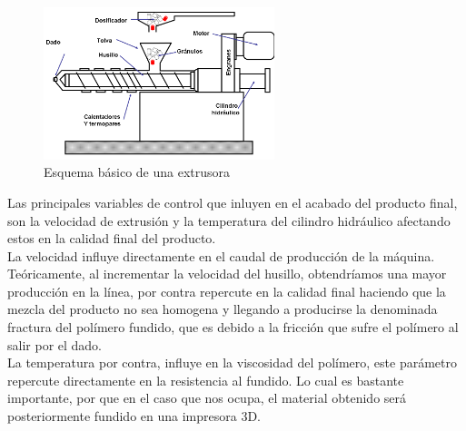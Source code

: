 \begin{figure}[H]
        \centering
        \includegraphics[width=0.6\textwidth]{images/extrusor.png}
        \caption{Esquema básico de una extrusora}
        \label{fig:estado_extrusora}
\end{figure}

Las principales variables de control que inluyen en el acabado del producto final, son la velocidad de extrusión y la temperatura del cilindro hidráulico afectando estos en la calidad final del producto.\\

La velocidad influye directamente en el caudal de producción de la máquina. Teóricamente, al incrementar la velocidad del husillo, obtendríamos una mayor producción en la línea, por contra repercute en la calidad final haciendo que la mezcla del producto no sea homogena y llegando a producirse la denominada fractura del polímero fundido, que es debido a la fricción que sufre el polímero al salir por el dado.\\

La temperatura por contra, influye en la viscosidad del polímero, este parámetro repercute directamente en la resistencia al fundido. Lo cual es bastante importante, por que en el caso que nos ocupa, el  material obtenido será posteriormente fundido en una impresora 3D.\\


